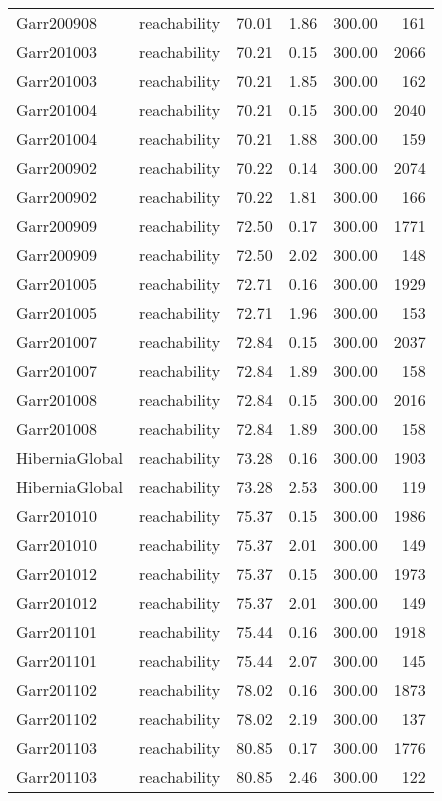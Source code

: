 \begin{tabular}{llrrrr}
Garr200908 & reachability & 70.01 & 1.86 & 300.00 & 161 \\
Garr201003 & reachability & 70.21 & 0.15 & 300.00 & 2066 \\
Garr201003 & reachability & 70.21 & 1.85 & 300.00 & 162 \\
Garr201004 & reachability & 70.21 & 0.15 & 300.00 & 2040 \\
Garr201004 & reachability & 70.21 & 1.88 & 300.00 & 159 \\
Garr200902 & reachability & 70.22 & 0.14 & 300.00 & 2074 \\
Garr200902 & reachability & 70.22 & 1.81 & 300.00 & 166 \\
Garr200909 & reachability & 72.50 & 0.17 & 300.00 & 1771 \\
Garr200909 & reachability & 72.50 & 2.02 & 300.00 & 148 \\
Garr201005 & reachability & 72.71 & 0.16 & 300.00 & 1929 \\
Garr201005 & reachability & 72.71 & 1.96 & 300.00 & 153 \\
Garr201007 & reachability & 72.84 & 0.15 & 300.00 & 2037 \\
Garr201007 & reachability & 72.84 & 1.89 & 300.00 & 158 \\
Garr201008 & reachability & 72.84 & 0.15 & 300.00 & 2016 \\
Garr201008 & reachability & 72.84 & 1.89 & 300.00 & 158 \\
HiberniaGlobal & reachability & 73.28 & 0.16 & 300.00 & 1903 \\
HiberniaGlobal & reachability & 73.28 & 2.53 & 300.00 & 119 \\
Garr201010 & reachability & 75.37 & 0.15 & 300.00 & 1986 \\
Garr201010 & reachability & 75.37 & 2.01 & 300.00 & 149 \\
Garr201012 & reachability & 75.37 & 0.15 & 300.00 & 1973 \\
Garr201012 & reachability & 75.37 & 2.01 & 300.00 & 149 \\
Garr201101 & reachability & 75.44 & 0.16 & 300.00 & 1918 \\
Garr201101 & reachability & 75.44 & 2.07 & 300.00 & 145 \\
Garr201102 & reachability & 78.02 & 0.16 & 300.00 & 1873 \\
Garr201102 & reachability & 78.02 & 2.19 & 300.00 & 137 \\
Garr201103 & reachability & 80.85 & 0.17 & 300.00 & 1776 \\
Garr201103 & reachability & 80.85 & 2.46 & 300.00 & 122 \\

\end{tabular}
